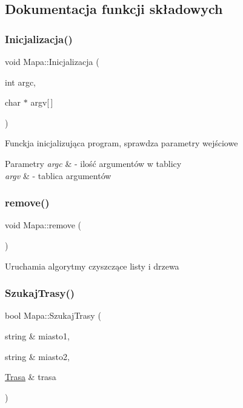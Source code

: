 \subsection{Dokumentacja funkcji składowych}
\mbox{\label{class_mapa_a4f087082b229de353eed60aa5732cc9e}} 
\subsubsection{\texorpdfstring{Inicjalizacja()}{Inicjalizacja()}}
{\footnotesize\ttfamily void Mapa\+::\+Inicjalizacja (\begin{DoxyParamCaption}\item[{int}]{argc,  }\item[{char $\ast$}]{argv\mbox{[}$\,$\mbox{]} }\end{DoxyParamCaption})}

Funckja inicjalizująca program, sprawdza parametry wejściowe 
\begin{DoxyParams}{Parametry}
{\em argc} & -\/ ilość argumentów w tablicy \\
\hline
{\em argv} & -\/ tablica argumentów \\
\hline
\end{DoxyParams}
\mbox{\label{class_mapa_a5146461b9ba729d9824e6b0f2c3cd312}} 
\subsubsection{\texorpdfstring{remove()}{remove()}}
{\footnotesize\ttfamily void Mapa\+::remove (\begin{DoxyParamCaption}{ }\end{DoxyParamCaption})}

Uruchamia algorytmy czyszczące listy i drzewa \mbox{\label{class_mapa_a80b6add069f75b6943244c2933d97b6a}} 
\subsubsection{\texorpdfstring{Szukaj\+Trasy()}{SzukajTrasy()}}
{\footnotesize\ttfamily bool Mapa\+::\+Szukaj\+Trasy (\begin{DoxyParamCaption}\item[{string \&}]{miasto1,  }\item[{string \&}]{miasto2,  }\item[{\mbox{\hyperlink{struct_trasa}{Trasa}} \&}]{trasa }\end{DoxyParamCaption})}

